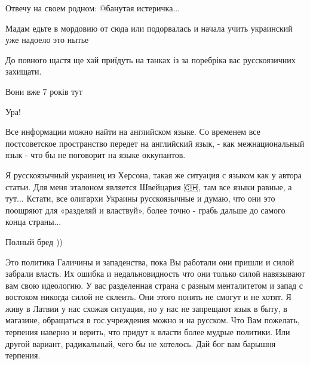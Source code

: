 \begin{itemize}
Отвечу на своем родном: @банутая истеричка...

Мадам едьте в мордовию от сюда или подорвалась и начала учить украинский уже надоело это нытье

До повного щастя ще хай приїдуть на танках із за поребріка вас русскоязичних захищати.

\begin{itemize}
Вони вже 7 років тут

Ура!
\end{itemize}

Все информации можно найти на английском языке. Со временем все постсоветское
пространство передет на английский язык, - как межнациональный язык - что бы не
поговорит на языке оккупантов.



Я русскоязычный украинец из Херсона, такая же ситуация с языком как у автора
статьи. Для меня эталоном является Швейцария 🇨🇭, там все языки равные, а
тут... Кстати, все олигархи Украины русскоязычные и думаю, что они это поощряют
для «разделяй и властвуй», более точно - грабь дальше до самого конца страны...

Полный бред ))


Это политика Галичины и западенства, пока Вы работали они пришли и силой
забрали власть. Их ошибка и недальновидность что они только силой навязывают
вам свою идеологию. У вас разделенная страна с разным менталитетом и запад с
востоком никогда силой не склеить. Они этого понять не смогут и не хотят. Я
живу в Латвии у нас схожая ситуация, но у нас не запрещают язык в быту, в
магазине, обращаться в гос.учреждения можно и на русском. Что Вам пожелать,
терпения наверно и верить, что придут к власти более мудрые политики. Или
другой вариант, радикальный, чего бы не хотелось. Дай бог вам барышня терпения.


\end{itemize}
